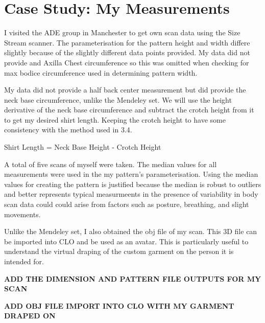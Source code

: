 \section{Case Study: My Measurements}
I visited the ADE group in Manchester to get own scan data using the Size Stream scanner. The parameterisation for the pattern height and width differe slightly because of the slightly different data points provided. 
My data did not provide and Axilla Chest circumference so this was omitted when checking for max bodice circumference used in determining pattern width.

My data did not provide a half back center measurement but did provide the neck base circumference, unlike the Mendeley set. We will use the height derivative of the neck base circumference and subtract the crotch height from it to get my desired shirt length. Keeping the crotch height to have some consistency with the method used in 3.4.

Shirt Length = Neck Base Height - Crotch Height

A total of five scans of myself were taken. The median values for all measurements were used in the my pattern's parameterisation. Using the median values for creating the pattern is justified because the median is robust to outliers and better represents typical measurmeents in the presence of variability in body scan data could could arise from factors such as posture, breathing, and slight movements.

Unlike the Mendeley set, I also obtained the obj file of my scan. This 3D file can be imported into CLO and be used as an avatar. This is particularly useful to understand the virtual draping of the custom garment on the person it is intended for.

\textbf{ADD THE DIMENSION AND PATTERN FILE OUTPUTS FOR MY SCAN}

\textbf{ADD OBJ FILE IMPORT INTO CLO WITH MY GARMENT DRAPED ON}